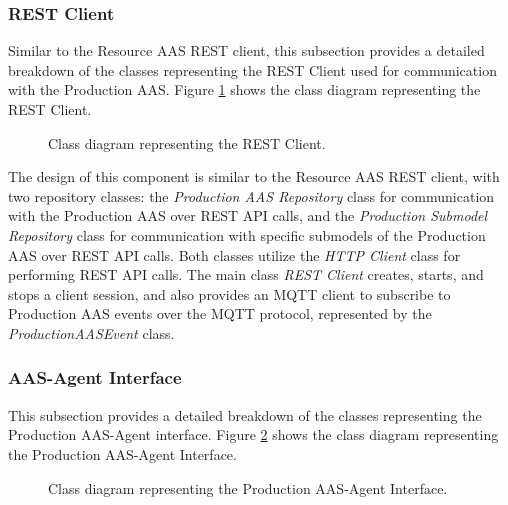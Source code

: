 \newpage
\subsubsection{REST Client}
Similar to the Resource AAS REST client, this subsection provides a detailed breakdown of the classes representing the REST Client used for communication with the Production AAS.
Figure \ref{fig:prod_rest_client_classes} shows the class diagram representing the REST Client.
\begin{figure}[ht]
    \centering  
    
    \caption{Class diagram representing the REST Client.}
    \label{fig:prod_rest_client_classes}
\end{figure}
The design of this component is similar to the Resource AAS REST client, with two repository classes: the \emph{Production AAS Repository} class for communication with the Production AAS over REST API calls, and the \emph{Production Submodel Repository} class for communication with specific submodels of the Production AAS over REST API calls.
Both classes utilize the \emph{HTTP Client} class for performing REST API calls.
The main class \emph{REST Client} creates, starts, and stops a client session, and also provides an MQTT client to subscribe to Production AAS events over the MQTT protocol, represented by the \emph{ProductionAASEvent} class.


\newpage
\subsubsection{AAS-Agent Interface}
This subsection provides a detailed breakdown of the classes representing the Production AAS-Agent interface.
Figure \ref{fig:prod_aas_agent_Translator_classes} shows the class diagram representing the Production AAS-Agent Interface.
\begin{figure}[ht]
    \centering  
    
    \caption{Class diagram representing the Production AAS-Agent Interface.}
    \label{fig:prod_aas_agent_Translator_classes}
\end{figure}

